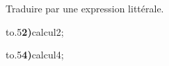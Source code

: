 \documentclass[exercice]{thedocument}%
\begin{document}
%
\smallskip\par\noindent Traduire par une expression littérale.\par\vskip10pt
\kern10pt\hbox{\hbox to.5\hbox{{\bfseries 2)}\kern10pt\<calcul2;\hfill}}\par\vskip8pt
\kern10pt\hbox{\hbox to.5\hbox{{\bfseries 4)}\kern10pt\<calcul4;\hfill}}
\end{document}

